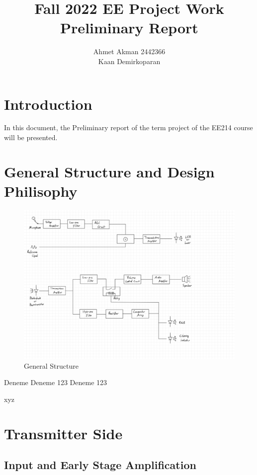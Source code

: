 \documentclass[a4paper,10pt]{article}
\begin{document}

\title{  Fall 2022 EE Project Work  \protect\\ Preliminary Report}
\author{ Ahmet Akman 2442366 \protect\\ Kaan Demirkoparan}
\date{}
\maketitle
\section{Introduction}
In this document, the Preliminary report of the term project of the EE214 course will be presented. 
\section{General Structure and Design Philisophy}
\begin{figure}[h]
    \centering
    \includegraphics[width = 1\textwidth]{general_structure.jpeg}
    \caption{General Structure}
\end{figure} 
Deneme
Deneme 123 Deneme 123

xyz

\section{Transmitter Side}
\subsection{Input and Early Stage Amplification}
\end{document}
